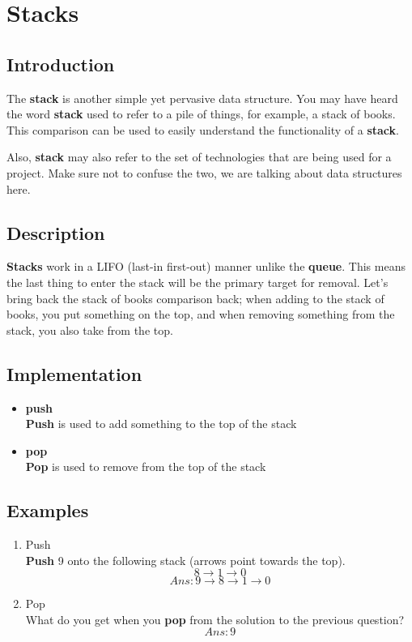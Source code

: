 \documentclass[11pt]{book}
\begin{document}
	\setcounter{chapter}{1}
	\chapter{Stacks}
	\section{Introduction}
		The \textbf{stack} is another simple yet pervasive data structure. You
		may have heard the word \textbf{stack} used to refer to a pile of things,
		for example, a stack of books. This comparison can be used to easily
		understand the functionality of a \textbf{stack}.

		Also, \textbf{stack} may also refer to the set of technologies that are
		being used for a project. Make sure not to confuse the two, we are
		talking about data structures here.

	\section{Description}
		\textbf{Stacks} work in a LIFO (last-in first-out) manner unlike the
		\textbf{queue}. This means the last thing to enter the stack will be
		the primary target for removal. Let's bring back the stack of books
		comparison back; when adding to the stack of books, you put something
		on the top, and when removing something from the stack, you also take
		from the top.

	\section{Implementation}
		\begin{itemize}
			\item \textbf{push} \\
				\textbf{Push} is used to add something to the top of the stack
			\item \textbf{pop} \\
				\textbf{Pop} is used to remove from the top of the stack
		\end{itemize}
		
	\section{Examples}
		\begin{enumerate}
			\item Push \\
				\textbf{Push} 9 onto the following stack (arrows point towards
				the top).
				\[
					8 \rightarrow 1 \rightarrow 0
				\]
				\[
					Ans: 9 \rightarrow 8 \rightarrow 1 \rightarrow 0
				\]
			\item Pop \\
				What do you get when you \textbf{pop} from the solution to the
				previous question?
				\[
					Ans: 9
				\]
		\end{enumerate}
\end{document}
